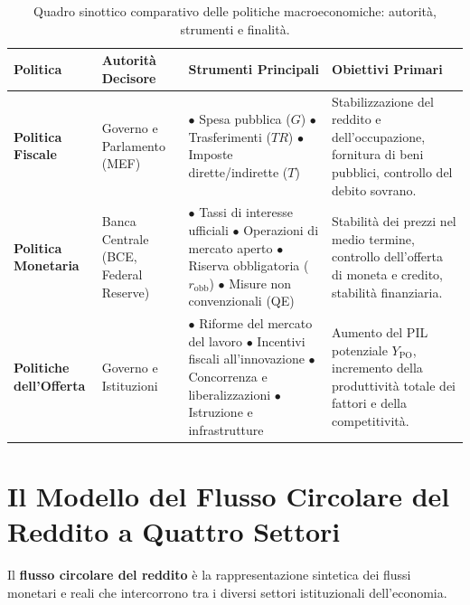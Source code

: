 \begin{table}[htbp]
\centering
\small
\renewcommand{\arraystretch}{1.35}
\begin{tabularx}{\textwidth}{l p{3.5cm} X X}
\toprule
\textbf{Politica} & \textbf{Autorità Decisore} & \textbf{Strumenti Principali} & \textbf{Obiettivi Primari} \\
\midrule
\textbf{Politica Fiscale} & 
Governo e Parlamento (MEF) & 
$\bullet$ Spesa pubblica ($G$)\newline
$\bullet$ Trasferimenti ($TR$)\newline
$\bullet$ Imposte dirette/indirette ($T$) & 
Stabilizzazione del reddito e dell'occupazione, fornitura di beni pubblici, controllo del debito sovrano. \\
\midrule
\textbf{Politica Monetaria} & 
Banca Centrale (BCE, Federal Reserve) & 
$\bullet$ Tassi di interesse ufficiali\newline
$\bullet$ Operazioni di mercato aperto\newline
$\bullet$ Riserva obbligatoria ($r_{\text{obb}}$)\newline
$\bullet$ Misure non convenzionali (QE) & 
Stabilità dei prezzi nel medio termine, controllo dell'offerta di moneta e credito, stabilità finanziaria. \\
\midrule
\textbf{Politiche dell'Offerta} & 
Governo e Istituzioni & 
$\bullet$ Riforme del mercato del lavoro\newline
$\bullet$ Incentivi fiscali all'innovazione\newline
$\bullet$ Concorrenza e liberalizzazioni\newline
$\bullet$ Istruzione e infrastrutture & 
Aumento del PIL potenziale $Y_{\mathrm{PO}}$, incremento della produttività totale dei fattori e della competitività. \\
\bottomrule
\end{tabularx}
\caption{Quadro sinottico comparativo delle politiche macroeconomiche: autorità, strumenti e finalità.}
\label{tab:politiche_macro_estesa}
\end{table}

\section{Il Modello del Flusso Circolare del Reddito a Quattro Settori}

Il \textbf{flusso circolare del reddito} è la rappresentazione sintetica dei flussi monetari e reali che intercorrono tra i diversi settori istituzionali dell'economia.

